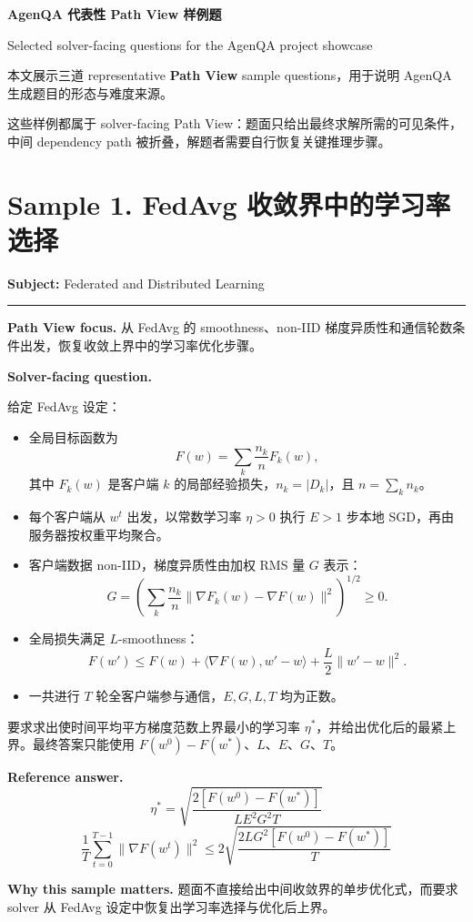 \documentclass[11pt]{ctexart}
\newcommand{\sampletitle}[2]{
  \section*{\textcolor{agenblue}{#1}}
  \textbf{Subject:} #2
  \vspace{0.25em}
  \hrule
  \vspace{0.6em}
}
\newcommand{\focus}[1]{\textbf{Path View focus.} #1}
\newcommand{\why}[1]{\textbf{Why this sample matters.} #1}
\begin{document}
{\LARGE \textbf{AgenQA 代表性 Path View 样例题}}

\vspace{0.4em}

{\large Selected solver-facing questions for the AgenQA project showcase}

\vspace{0.8em}

本文展示三道 representative \textbf{Path View} sample questions，用于说明 AgenQA 生成题目的形态与难度来源。

这些样例都属于 solver-facing Path View：题面只给出最终求解所需的可见条件，中间 dependency path 被折叠，解题者需要自行恢复关键推理步骤。

\sampletitle{Sample 1. FedAvg 收敛界中的学习率选择}{Federated and Distributed Learning}

\focus{从 FedAvg 的 smoothness、non-IID 梯度异质性和通信轮数条件出发，恢复收敛上界中的学习率优化步骤。}

\textbf{Solver-facing question.}

给定 FedAvg 设定：
\begin{itemize}
  \item 全局目标函数为
  \[
  F(w)=\sum_k \frac{n_k}{n}F_k(w),
  \]
  其中 $F_k(w)$ 是客户端 $k$ 的局部经验损失，$n_k=|D_k|$，且 $n=\sum_k n_k$。
  \item 每个客户端从 $w^t$ 出发，以常数学习率 $\eta>0$ 执行 $E>1$ 步本地 SGD，再由服务器按权重平均聚合。
  \item 客户端数据 non-IID，梯度异质性由加权 RMS 量 $G$ 表示：
  \[
  G=\left(\sum_k \frac{n_k}{n}\|\nabla F_k(w)-\nabla F(w)\|^2\right)^{1/2}\geq 0.
  \]
  \item 全局损失满足 $L$-smoothness：
  \[
  F(w')\leq F(w)+\langle \nabla F(w),w'-w\rangle+\frac{L}{2}\|w'-w\|^2.
  \]
  \item 一共进行 $T$ 轮全客户端参与通信，$E,G,L,T$ 均为正数。
\end{itemize}

要求求出使时间平均平方梯度范数上界最小的学习率 $\eta^\ast$，并给出优化后的最紧上界。最终答案只能使用 $F(w^0)-F(w^\ast)$、$L$、$E$、$G$、$T$。

\textbf{Reference answer.}
\[
\boxed{
\eta^\ast=
\sqrt{\frac{2[F(w^0)-F(w^\ast)]}{L E^2G^2T}}
}
\]
\[
\boxed{
\frac{1}{T}\sum_{t=0}^{T-1}\|\nabla F(w^t)\|^2
\leq
2\sqrt{\frac{2LG^2[F(w^0)-F(w^\ast)]}{T}}
}
\]

\why{题面不直接给出中间收敛界的单步优化式，而要求 solver 从 FedAvg 设定中恢复出学习率选择与优化后上界。}
\end{document}
